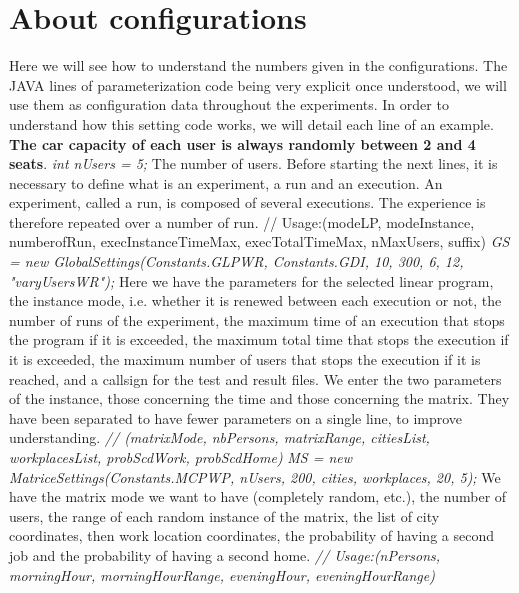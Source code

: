 \documentclass[12pt, a4paper, twoside]{memoir}
\newcommand{\newpar}{\vskip 0.2in \noindent}
\newcommand\tab[1][1cm]{\hspace*{#1}}
\begin{document}
{	\section{About configurations}
	Here we will see how to understand the numbers given in the configurations. The JAVA lines of parameterization code being very explicit once understood, we will use them as configuration data throughout the experiments. In order to understand how this setting code works, we will detail each line of an example. \textbf{The car capacity of each user is always randomly between 2 and 4 seats}.
	\newpar
	\tab \textit{int nUsers = 5;}\newline
	The number of users.
	\newpar
	Before starting the next lines, it is necessary to define what is an experiment, a run and an execution. An experiment, called a run, is composed of several executions. The experience is therefore repeated over a number of run.\newline
	\tab // Usage:(modeLP, modeInstance, numberofRun, execInstanceTimeMax, execTotalTimeMax, nMaxUsers, suffix)\newline
	\tab \textit{GS = new GlobalSettings(Constants.GLPWR, Constants.GDI, 10, 300, 6, 12, "varyUsersWR");}\newline
	Here we have the parameters for the selected linear program, the instance mode, i.e. whether it is renewed between each execution or not, the number of runs of the experiment, the maximum time of an execution that stops the program if it is exceeded, the maximum total time that stops the execution if it is exceeded, the maximum number of users that stops the execution if it is reached, and a callsign for the test and result files. 
	\newpar
	We enter the two parameters of the instance, those concerning the time and those concerning the matrix. They have been separated to have fewer parameters on a single line, to improve understanding.
	\newpar
	\tab \textit{// (matrixMode, nbPersons, matrixRange, citiesList, workplacesList, probScdWork, probScdHome)}\newline
	\tab \textit{MS = new MatriceSettings(Constants.MCPWP, nUsers, 200, cities, workplaces, 20, 5);}\newline
	We have the matrix mode we want to have (completely random, etc.), the number of users, the range of each random instance of the matrix, the list of city coordinates, then work location coordinates, the probability of having a second job and the probability of having a second home.
	\newpar
	\tab \textit{// Usage:(nPersons, morningHour, morningHourRange, eveningHour, eveningHourRange)}\newline
}
\end{document}

